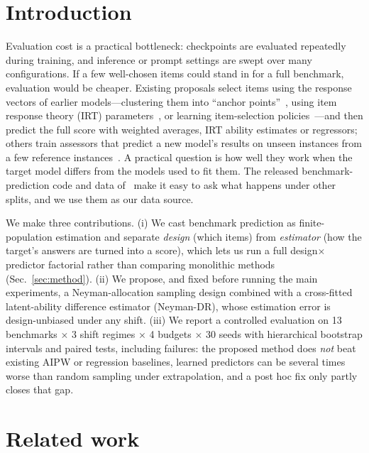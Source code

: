 \documentclass{article}
\begin{document}
\section{Introduction}
Evaluation cost is a practical bottleneck: checkpoints are evaluated repeatedly during training, and inference or prompt settings are swept over many configurations.
If a few well-chosen items could stand in for a full benchmark, evaluation would be cheaper.
Existing proposals select items using the response vectors of earlier models---clustering them into ``anchor points''~\citep{vivek2024anchor}, using item response theory (IRT) parameters~\citep{polo2024tiny,kipnis2025metabench}, or learning item-selection policies~\citep{li2025active}---and then predict the full score with weighted averages, IRT ability estimates or regressors; others train assessors that predict a new model's results on unseen instances from a few reference instances~\citep{pacchiardi2024100}.
A practical question is how well they work when the target model differs from the models used to fit them.
The released benchmark-prediction code and data of~\citet{zhang2025benchmark} make it easy to ask what happens under other splits, and we use them as our data source.

We make three contributions.
(i) We cast benchmark prediction as finite-population estimation and separate \emph{design} (which items) from \emph{estimator} (how the target's answers are turned into a score), which lets us run a full design$\times$predictor factorial rather than comparing monolithic methods (Sec.~\ref{sec:method}).
(ii) We propose, and fixed before running the main experiments, a Neyman-allocation sampling design combined with a cross-fitted latent-ability difference estimator (Neyman-DR), whose estimation error is design-unbiased under any shift.
(iii) We report a controlled evaluation on 13 benchmarks $\times$ 3 shift regimes $\times$ 4 budgets $\times$ 30 seeds with hierarchical bootstrap intervals and paired tests, including failures: the proposed method does \emph{not} beat existing AIPW or regression baselines, learned predictors can be several times worse than random sampling under extrapolation, and a post hoc fix only partly closes that gap.

\section{Related work}
\end{document}
